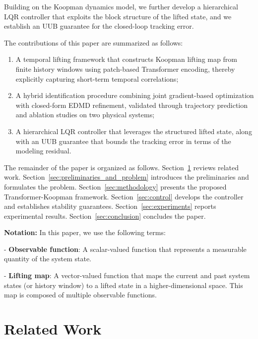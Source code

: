 \documentclass[journal]{IEEEtran}
\begin{document}
Building on the Koopman dynamics model, we further develop a hierarchical LQR controller that exploits  the block structure of the lifted state, and we establish an UUB guarantee for the closed-loop tracking error. 

The contributions of this paper are summarized as follows:
\begin{enumerate}
\item A temporal lifting framework that constructs Koopman lifting map from finite history windows using patch-based Transformer encoding, thereby explicitly capturing short-term temporal correlations;
\item A hybrid identification procedure combining joint gradient-based optimization with closed-form EDMD refinement, validated through trajectory prediction and ablation studies on two physical systems;
\item A hierarchical LQR controller that leverages the structured lifted state, along with an UUB guarantee that bounds the tracking error in terms of the modeling residual.
\end{enumerate}

The remainder of the paper is organized as follows. Section~\ref{sec:related_work} reviews related work. Section~\ref{sec:preliminaries_and_problem} introduces the preliminaries and formulates the problem. Section~\ref{sec:methodology} presents the proposed Transformer-Koopman framework. Section~\ref{sec:control} develops the controller and establishes stability guarantees. Section~\ref{sec:experiments} reports experimental results. Section~\ref{sec:conclusion} concludes the paper.


\textbf{Notation:} In this paper, we use the following terms:

- \textbf{Observable function}: A scalar-valued function that represents a measurable quantity of the system state. 

- \textbf{Lifting map}: A vector-valued function  that maps the current and past system states (or history window) to a lifted state in a higher-dimensional space. This map is composed of multiple observable functions.



\section{Related Work}
\label{sec:related_work}
\end{document}
